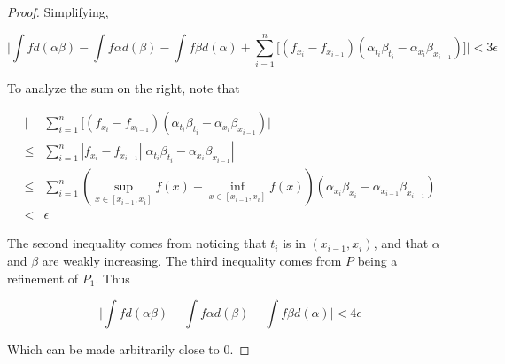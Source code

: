 \documentclass{amsart}
\begin{document}
\begin{proof}
Simplifying,

\[
\bigg|
\int f d(\alpha\beta) - \int f\alpha d(\beta) - \int f\beta d(\alpha) +
\sum_{i=1}^n \Big[
(f_{x_i} - f_{x_{i-1}}) (\alpha_{t_i}\beta_{t_i} - \alpha_{x_i}\beta_{x_{i-1}})
\Big] \bigg|
< 3\epsilon
\]

To analyze the sum on the right, note that

\begin{align*}
\bigg|
&\sum_{i=1}^n \Big[(f_{x_i} - f_{x_{i-1}}) (\alpha_{t_i}\beta_{t_i} - \alpha_{x_i}\beta_{x_{i-1}})
\bigg| \\
\leq &\sum_{i=1}^n \left|f_{x_i} - f_{x_{i-1}}\right| \left|\alpha_{t_i}\beta_{t_i} - \alpha_{x_i}\beta_{x_{i-1}}\right| \\
\leq &\sum_{i=1}^n \left(\sup_{x \in [x_{i-1}, x_i]} f(x) - \inf_{x \in [x_{i-1}, x_i]} f(x)\right)
\left(\alpha_{x_i}\beta_{x_i} - \alpha_{x_{i-1}}\beta_{x_{i-1}}\right) \\
< &\epsilon
\end{align*}

The second inequality comes from noticing that $t_i$ is in $(x_{i-1}, x_i)$, and that $\alpha$ and $\beta$ are weakly increasing. The third inequality comes from $P$ being a refinement of $P_1$. Thus

\[
\bigg| \int f d(\alpha\beta) - \int f\alpha d(\beta) - \int f\beta d(\alpha) \bigg|
< 4\epsilon
\]

Which can be made arbitrarily close to 0.

\end{proof}
\end{document}
